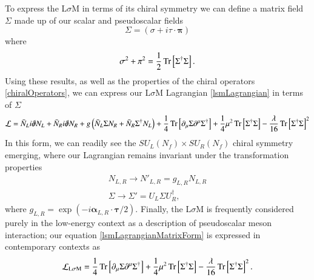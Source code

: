 \documentclass[aps,prd,onecolumn,showpacs,amsmath,amssymb,nofootinbib]{revtex4} \pdfoutput=1
\newcommand{\lsm}{L$\sigma$M}
\begin{document}
To express the {\lsm} in terms of its chiral symmetry we can define a matrix field $\Sigma$ made up of our scalar and pseudoscalar fields
\begin{equation}
    \Sigma = \left(\sigma + i \tau \cdot \mathbf{\pi}\right)
    \label{lsm-matrix}
\end{equation}
where
\begin{equation}
    \sigma^{2} + \pi^{2} = \frac{1}{2}\Tr\left[\Sigma^{\dagger}\Sigma\right].
    \label{sigma-field}
\end{equation}
Using these results, as well as the properties of the chiral operators \eqref{chiralOperators}, we can express our {\lsm} Lagrangian \eqref{lsmLagrangian} in terms of $\Sigma$
\begin{equation}\label{lsmLagrangianMatrixForm}
\mathcal{L} = \bar{N}_{L}i \slashed{\partial}N_{L} + \bar{N}_{R}i \slashed{\partial}N_{R} + g\left( \bar{N}_{L}\Sigma N_{R} + \bar{N}_{R}\Sigma^{\dagger} N_{L} \right) + \frac{1}{4}\Tr\left[\partial_{\mu}\Sigma\partial^{\mu}\Sigma^{\dagger}\right] + \frac{1}{4} \mu^{2} \Tr\left[\Sigma^{\dagger}\Sigma\right] - \frac{\lambda}{16}\Tr\left[\Sigma^{\dagger}\Sigma\right]^{2}
\end{equation}
In this form, we can readily see the ${S\!U}_L(N_f)\times {S\!U}_R(N_f)$ chiral symmetry emerging, where our Lagrangian remains invariant under the transformation properties
\begin{gather}\label{su2Symmetries}
    N_{L,R} \rightarrow {N'}_{L,R} = g_{L,R} N_{L,R}\\
    \Sigma \rightarrow {\Sigma'} = U_{L}\Sigma U^{\dagger}_{R},
\end{gather}
where $g_{L,R} = \exp(-i \mathbf{\alpha}_{L,R}\cdot\mathbf{\tau}/2)$. Finally, the {\lsm} is frequently considered purely in the low-energy context as a description of pseudoscalar meson interaction; our equation \eqref{lsmLagrangianMatrixForm} is expressed in contemporary contexts as
\begin{equation}
    \mathcal{L}_{\mathrm{L\sigma M}} = \frac{1}{4}\Tr\left[\partial_{\mu}\Sigma\partial^{\mu}\Sigma^{\dagger}\right] + \frac{1}{4} \mu^{2} \Tr\left[\Sigma^{\dagger}\Sigma\right] - \frac{\lambda}{16}\Tr\left[\Sigma^{\dagger}\Sigma\right]^{2}.
    \label{lsmLagrangianMatrixForm-scalar}
\end{equation}
\end{document}
